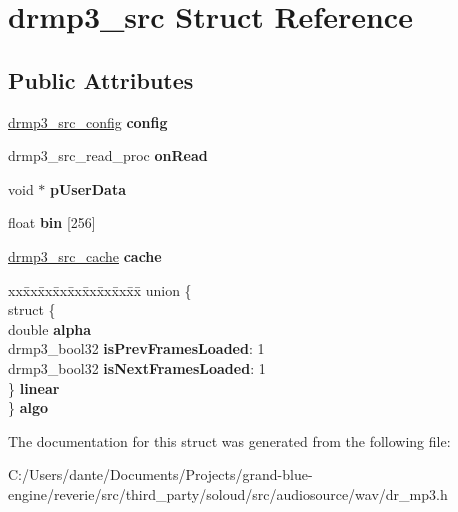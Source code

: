 \hypertarget{structdrmp3__src}{}\section{drmp3\+\_\+src Struct Reference}
\label{structdrmp3__src}
\subsection*{Public Attributes}
\begin{DoxyCompactItemize}
\item 
\mbox{\label{structdrmp3__src_adae4e2e98280180c76c52c6147b3433c}} 
\mbox{\hyperlink{structdrmp3__src__config}{drmp3\+\_\+src\+\_\+config}} {\bfseries config}
\item 
\mbox{\label{structdrmp3__src_af2cdb6236330db903def504c2a1681ba}} 
drmp3\+\_\+src\+\_\+read\+\_\+proc {\bfseries on\+Read}
\item 
\mbox{\label{structdrmp3__src_a1fec2583cbc63b5b499022f4f743b597}} 
void $\ast$ {\bfseries p\+User\+Data}
\item 
\mbox{\label{structdrmp3__src_afe670441abbb601153e5342f9bf87484}} 
float {\bfseries bin} \mbox{[}256\mbox{]}
\item 
\mbox{\label{structdrmp3__src_aa8e4b0725633f13c0c79e77ee1a161ae}} 
\mbox{\hyperlink{structdrmp3__src__cache}{drmp3\+\_\+src\+\_\+cache}} {\bfseries cache}
\item 
\mbox{\label{structdrmp3__src_a358eae79c986aaf0d569ba1ea7f50f26}} 
\begin{tabbing}
xx\=xx\=xx\=xx\=xx\=xx\=xx\=xx\=xx\=\kill
union \{\\
\>struct \{\\
\>\>double {\bfseries alpha}\\
\>\>drmp3\_bool32 {\bfseries isPrevFramesLoaded}: 1\\
\>\>drmp3\_bool32 {\bfseries isNextFramesLoaded}: 1\\
\>\} {\bfseries linear}\\
\} {\bfseries algo}\\

\end{tabbing}\end{DoxyCompactItemize}


The documentation for this struct was generated from the following file\+:\begin{DoxyCompactItemize}
\item 
C\+:/\+Users/dante/\+Documents/\+Projects/grand-\/blue-\/engine/reverie/src/third\+\_\+party/soloud/src/audiosource/wav/dr\+\_\+mp3.\+h\end{DoxyCompactItemize}
